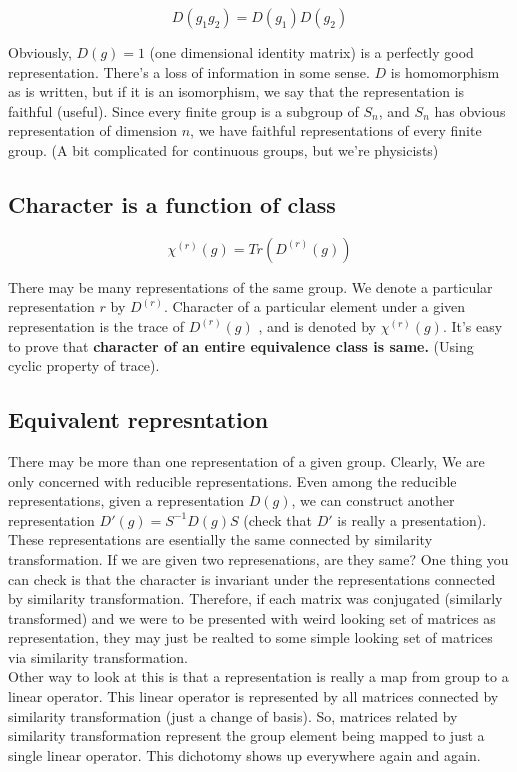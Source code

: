 \documentclass{report}
\begin{document}
$$D(g_1 g_2) = D(g_1)D(g_2)$$

\noindent Obviously, $D(g) = 1$ (one dimensional identity matrix) is a perfectly good representation. There's a loss of information in some sense. $D$ is homomorphism as is written, but if it is an isomorphism, we say that the representation is faithful (useful). Since every finite group is a subgroup of $S_n$, and $S_n$ has obvious representation of dimension $n$, we have faithful representations of every finite group. (A bit complicated for continuous groups, but we're physicists)

\subsection{Character is a function of class}

$$\chi^{(r)}(g) = Tr(D^{(r)}(g))$$

\noindent There may be many representations of the same group. We denote a particular representation $r$ by $D^{(r)}$. Character of a particular element under a given representation is the trace of $D^{(r)}(g)$ , and is denoted by $\chi^{(r)}(g)$. It's easy to prove that \textbf{character of an entire equivalence class is same.} (Using cyclic property of trace).

\subsection{Equivalent represntation} 

There may be more than one representation of a given group. Clearly, We are only concerned with reducible representations. Even among the reducible representations, given a representation $D(g)$, we can construct another representation $D'(g) = S^{-1} D(g) S$ (check that $D'$ is really a presentation). These representations are esentially the same connected by similarity transformation. If we are given two represenations, are they same? One thing you can check is that the character is invariant under the representations connected by similarity transformation. Therefore, if each matrix was conjugated (similarly transformed) and we were to be presented with weird looking set of matrices as representation, they may just be realted to some simple looking set of matrices via similarity transformation.\\

\noindent Other way to look at this is that a representation is really a map from group to a linear operator. This linear operator is represented by all matrices connected by similarity transformation (just a change of basis). So, matrices related by similarity transformation represent the group element being mapped to just a single linear operator. This dichotomy shows up everywhere again and again.
\end{document}
